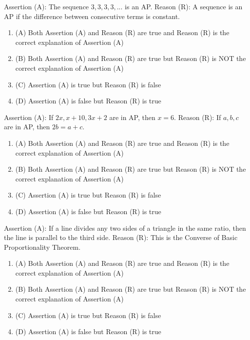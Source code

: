 \documentclass[12pt,a4paper]{exam}
\begin{document}
\begin{questions}
\question[1] Assertion (A): The sequence $3, 3, 3, 3, ...$ is an AP. Reason (R): A sequence is an AP if the difference between consecutive terms is constant.
\begin{enumerate}[label=(\Alph*)]
  \item (A) Both Assertion (A) and Reason (R) are true and Reason (R) is the correct explanation of Assertion (A)
  \item (B) Both Assertion (A) and Reason (R) are true but Reason (R) is NOT the correct explanation of Assertion (A)
  \item (C) Assertion (A) is true but Reason (R) is false
  \item (D) Assertion (A) is false but Reason (R) is true
\end{enumerate}
\vspace{0.15cm}

\question[1] Assertion (A): If $2x, x+10, 3x+2$ are in AP, then $x=6$. Reason (R): If $a, b, c$ are in AP, then $2b = a+c$.
\begin{enumerate}[label=(\Alph*)]
  \item (A) Both Assertion (A) and Reason (R) are true and Reason (R) is the correct explanation of Assertion (A)
  \item (B) Both Assertion (A) and Reason (R) are true but Reason (R) is NOT the correct explanation of Assertion (A)
  \item (C) Assertion (A) is true but Reason (R) is false
  \item (D) Assertion (A) is false but Reason (R) is true
\end{enumerate}
\vspace{0.15cm}

\question[1] Assertion (A): If a line divides any two sides of a triangle in the same ratio, then the line is parallel to the third side. Reason (R): This is the Converse of Basic Proportionality Theorem.
\begin{enumerate}[label=(\Alph*)]
  \item (A) Both Assertion (A) and Reason (R) are true and Reason (R) is the correct explanation of Assertion (A)
  \item (B) Both Assertion (A) and Reason (R) are true but Reason (R) is NOT the correct explanation of Assertion (A)
  \item (C) Assertion (A) is true but Reason (R) is false
  \item (D) Assertion (A) is false but Reason (R) is true
\end{enumerate}
\vspace{0.15cm}


\end{questions}
\end{document}
